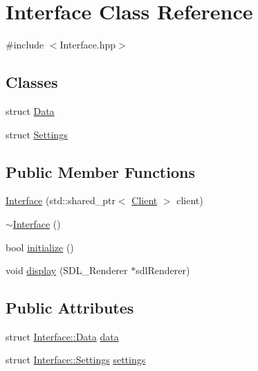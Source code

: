 \hypertarget{classInterface}{\section{Interface Class Reference}
\label{classInterface}
}


{\ttfamily \#include $<$Interface.\-hpp$>$}

\subsection*{Classes}
\begin{DoxyCompactItemize}
\item 
struct \hyperlink{structInterface_1_1Data}{Data}
\item 
struct \hyperlink{structInterface_1_1Settings}{Settings}
\end{DoxyCompactItemize}
\subsection*{Public Member Functions}
\begin{DoxyCompactItemize}
\item 
\hyperlink{classInterface_a3c4b9d39cd94e3eb5a6e8df2b08dae1f}{Interface} (std\-::shared\-\_\-ptr$<$ \hyperlink{classClient}{Client} $>$ client)
\item 
\hyperlink{classInterface_a19179888f29f18f1be54a3dfe98f68c0}{$\sim$\-Interface} ()
\item 
bool \hyperlink{classInterface_afc13692f1bad7f63aa18766c6e70f3f6}{initialize} ()
\item 
void \hyperlink{classInterface_a496951834bbad31f2093bdc7de8bd6c5}{display} (S\-D\-L\-\_\-\-Renderer $\ast$sdl\-Renderer)
\end{DoxyCompactItemize}
\subsection*{Public Attributes}
\begin{DoxyCompactItemize}
\item 
struct \hyperlink{structInterface_1_1Data}{Interface\-::\-Data} \hyperlink{classInterface_ae0ceef47e2d6be8db4c7ddd85edb059c}{data}
\item 
struct \hyperlink{structInterface_1_1Settings}{Interface\-::\-Settings} \hyperlink{classInterface_ac125cb8bbce29de6732096369765dc71}{settings}
\end{DoxyCompactItemize}


